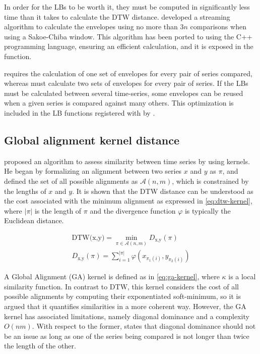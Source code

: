 In order for the LBs to be worth it,
they must be computed in significantly less time than it takes to calculate the DTW distance.
\citet{lemire2009} developed a streaming algorithm to calculate the envelopes using no more than $3n$ comparisons when using a Sakoe-Chiba window.
This algorithm has been ported to \dtwclust{} using the C++ programming language,
ensuring an efficient calculation,
and it is exposed in the  function.

 requires the calculation of one set of envelopes for every pair of series compared,
whereas  must calculate two sets of envelopes for every pair of series.
If the LBs must be calculated between several time-series,
some envelopes can be reused when a given series is compared against many others.
This optimization is included in the LB functions registered with  by \dtwclust{}.

\subsection{Global alignment kernel distance}
\label{sec:gak}

\citet{cuturi2011} proposed an algorithm to assess similarity between time series by using kernels.
He began by formalizing an alignment between two series $x$ and $y$ as $\pi$,
and defined the set of all possible alignments as $\mathcal{A}(n,m)$,
which is constrained by the lengths of $x$ and $y$.
It is shown that the DTW distance can be understood as the cost associated with the minimum alignment as expressed in \cref{eq:dtw-kernel},
where $|\pi|$ is the length of $\pi$ and the divergence function $\varphi$ is typically the Euclidean distance.

\begin{subequations}
\label{eq:dtw-kernel}
\begin{gather}
\text{DTW(x,y)} = \min_{\pi \in \mathcal{A}(n,m)} D_{\text{x,y}}(\pi) \\
D_{\text{x,y}}(\pi) = \sum_{i=1}^{|\pi|} \varphi \left( x_{\pi_1(i)}, y_{\pi_2(i)} \right)
\end{gather}
\end{subequations}

A Global Alignment (GA) kernel is defined as in \cref{eq:ga-kernel},
where $\kappa$ is a local similarity function.
In contrast to DTW,
this kernel considers the cost of all possible alignments by computing their exponentiated soft-minimum,
so it is argued that it quantifies similarities in a more coherent way.
However, the GA kernel has associated limitations,
namely diagonal dominance and a complexity $O(nm)$.
With respect to the former,
\citet{cuturi2011} states that diagonal dominance should not be an issue as long as one of the series being compared is not longer than twice the length of the other.

